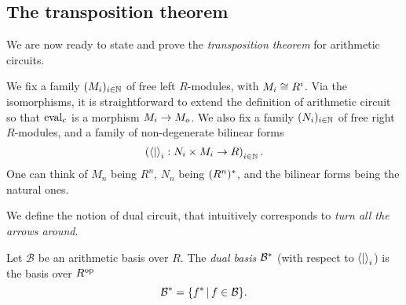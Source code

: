 \subsection{The transposition theorem}
\label{sec:tellegen}
We are now ready to state and prove the
\emph{transposition theorem} for
arithmetic circuits. 

We fix a family $(M_i)_{i\in\mathbb{N}}$ of free left $R$-modules, with
$M_i\cong R^i$. Via the isomorphisms, it is straightforward to extend
the definition of arithmetic circuit so that $\operatorname{eval}_c$ is a morphism
$M_i\rightarrow M_o$.  We also fix a family $(N_i)_{i\in\mathbb{N}}$ of free right
$R$-modules, and a family of non-degenerate bilinear forms
\begin{equation}
  \label{eq:240}
  \left(\left\langle  \middle|  \right\rangle_i:N_i\times M_i\rightarrow R\right)_{i\in\mathbb{N}}
  \text{.}
\end{equation}
One can think of $M_n$ being $R^n$, $N_n$ being $(R^n)^\ast$, and
the bilinear forms being the natural ones.

We define the notion of dual circuit, that intuitively corresponds to
\emph{turn all the arrows around}.

\begin{definition}
  Let $\mathcal{B}$ be an arithmetic basis over $R$. The
  \emph{dual basis} $\mathcal{B}^\ast$
  (with respect to $\left\langle  \middle|  \right\rangle_i$) is the basis over $R^{\mathrm{op}}$
  \begin{equation}
    \label{eq:241}
    \mathcal{B}^\ast = \{f^\ast \,|\, f\in\mathcal{B}\}
    \text{.}
  \end{equation}
\end{definition}

